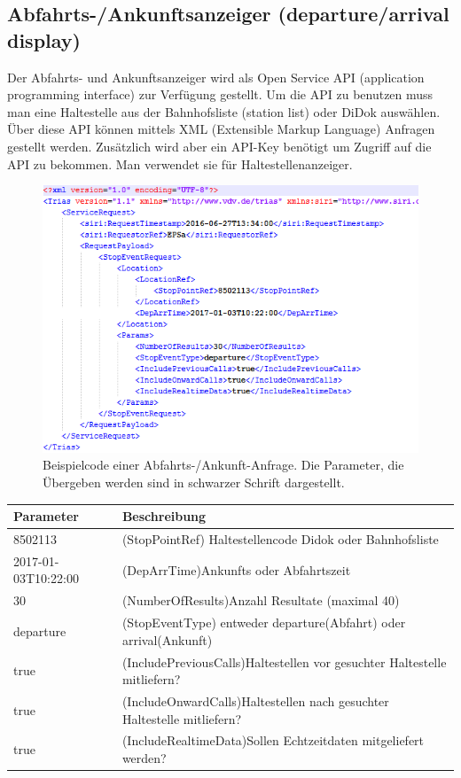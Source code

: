 \documentclass[a4paper,12pt]{scrartcl}
\begin{document}
\subsection{Abfahrts-/Ankunftsanzeiger (departure/arrival display)}%
\label{sec:Abfahrts-/Ankunftsanzeiger}
Der Abfahrts- und Ankunftsanzeiger wird als Open Service API (application programming interface) zur Verfügung gestellt. Um die API zu benutzen muss man eine Haltestelle aus der Bahnhofsliste (station list) oder DiDok auswählen. Über diese API können mittels XML (Extensible Markup Language) Anfragen gestellt werden. Zusätzlich wird aber ein API-Key benötigt um Zugriff auf die API zu bekommen. Man verwendet sie für Haltestellenanzeiger. \cite{abfahrts-ankunftsanzeige}

\begin{figure}[]
	\centering
	\includegraphics[width=12cm]{img/bspAbfrageAnkunftAbfahrt.png}
	\caption{Beispielcode einer Abfahrts-/Ankunft-Anfrage. Die Parameter, die Übergeben werden sind in schwarzer Schrift dargestellt.\cite{abfahrts-ankunftsanzeige}}
	\label{fig:Beispiel Anfrage Abfahrts-/Ankunftsanzeiger}
\end{figure}
\begin{tabular}{|l|l|}  \hline
	Parameter & Beschreibung \\ \hline
	8502113 & (StopPointRef) Haltestellencode Didok oder Bahnhofsliste   \\ \hline
	2017-01-03T10:22:00 & (DepArrTime)Ankunfts oder Abfahrtszeit \\ \hline
	30 & (NumberOfResults)Anzahl Resultate (maximal 40) \\ \hline
	departure & (StopEventType) entweder departure(Abfahrt) oder arrival(Ankunft) \\ \hline
	true & (IncludePreviousCalls)Haltestellen vor gesuchter Haltestelle mitliefern? \\ \hline	
	true & (IncludeOnwardCalls)Haltestellen nach gesuchter Haltestelle mitliefern? \\ \hline
	true & (IncludeRealtimeData)Sollen Echtzeitdaten mitgeliefert werden? \\ \hline
\end{tabular}
\end{document}
